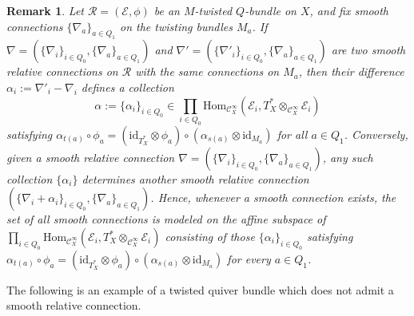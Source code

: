 \documentclass[12pt, reqno]{amsart}
\theoremstyle{plain}
\newtheorem{remark}[theorem]{Remark}
\numberwithin{equation}{section}
\begin{document}
	\begin{remark}
	\rm Let $\mathcal{R}=(\mathcal{E}, \phi)$ be an $M$-twisted $Q$-bundle on $X$, and fix smooth connections $\{\nabla_a\}_{a\in Q_1}$ on the twisting bundles $M_a$. If $\nabla=(\{\nabla_i\}_{i \in Q_0}, \{\nabla_a\}_{a\in Q_1})$ and $\nabla'=(\{\nabla'_i\}_{i \in Q_0}, \{\nabla_a\}_{a\in Q_1})$ are two smooth relative connections on $\mathcal{R}$ with the same connections on $M_a$, then their difference $\alpha_{i}:=\nabla'_i-\nabla_i$ defines a collection
	$$\alpha :=\{\alpha_i\}_{i\in Q_0}\in \prod_{i\in Q_0}\mathrm{Hom}_{\mathcal{C}^\infty_X}(\mathcal{E}_i, T^*_X \otimes_{\mathcal{C}^{\infty}_X}\mathcal{E}_{i})$$
	satisfying $\alpha_{t(a)}\circ \phi_a=(\mathrm{id}_{T_X^*} \otimes \phi_a) \circ (\alpha_{s(a)} \otimes \mathrm{id}_{M_a})$ for all $a\in Q_1$. Conversely, given a smooth relative connection $\nabla=(\{\nabla_i\}_{i \in Q_0}, \{\nabla_a\}_{a\in Q_1})$, any such collection $\{\alpha_{i}\}$ determines another smooth relative connection $(\{\nabla_i + \alpha_{i}\}_{i \in Q_0}, \{\nabla_a\}_{a\in Q_1})$. Hence, whenever a smooth connection exists, the set of all smooth connections is modeled on the affine subspace of $ \prod_{i\in Q_0}\mathrm{Hom}_{\mathcal{C}^\infty_X}(\mathcal{E}_i, T^*_X \otimes_{\mathcal{C}^{\infty}_X}\mathcal{E}_{i})$ consisting of those $\{\alpha_i\}_{i\in Q_0}$ satisfying  $\alpha_{t(a)}\circ \phi_a=(\mathrm{id}_{T_X^*} \otimes \phi_a) \circ (\alpha_{s(a)} \otimes \mathrm{id}_{M_a})$ for every $a\in Q_1$.
\end{remark}

	
The following is an example of a twisted quiver bundle which does not admit a smooth relative connection.
	
\end{document}
